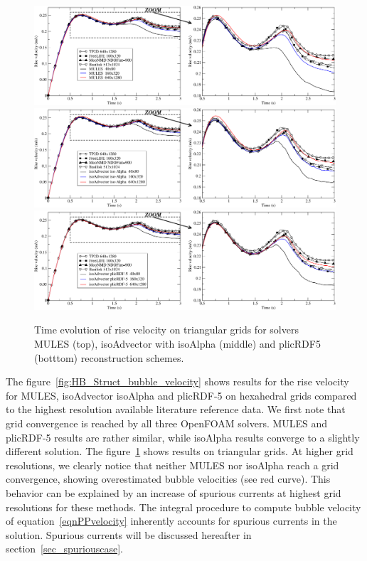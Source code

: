 \documentclass[review]{elsarticle}
\begin{document}
\begin{figure}[!h]
\begin{center}
 \vspace{-1mm}
 \includegraphics[width=\textwidth]{figures/HysingB-uns_bubble_velocity_MULES.pdf}
 \includegraphics[width=\textwidth]{figures/HysingB-uns_bubble_velocity_isoAlpha.pdf}
 \includegraphics[width=\textwidth]{figures/HysingB-uns_bubble_velocity_plicRDF5.pdf}
 \vspace{-14mm}
\end{center}
\caption{Time evolution of rise velocity on triangular grids for solvers MULES (top), isoAdvector with isoAlpha (middle) and plicRDF5 (botttom) reconstruction schemes.}
\label{fig:HB_Uns_bubble_velocity}
\end{figure}
 
The figure~\ref{fig:HB_Struct_bubble_velocity} shows results for the rise velocity for MULES, isoAdvector isoAlpha and plicRDF-5 on hexahedral grids compared to the highest resolution available literature reference data. We first note that grid convergence is reached by all three OpenFOAM solvers. MULES and plicRDF-5 results are rather similar, while isoAlpha results converge to a slightly different solution. The figure~\ref{fig:HB_Uns_bubble_velocity} shows results on triangular grids. At higher grid resolutions, we clearly notice that neither MULES nor isoAlpha reach a grid convergence, showing overestimated bubble velocities (see red curve). This behavior can be explained by an increase of spurious currents at highest grid resolutions for these methods. The integral procedure to compute bubble velocity of equation~\ref{eqnPPvelocity} inherently accounts for spurious currents in the solution. Spurious currents will be discussed hereafter in section~\ref{sec_spuriouscase}.
\end{document}
